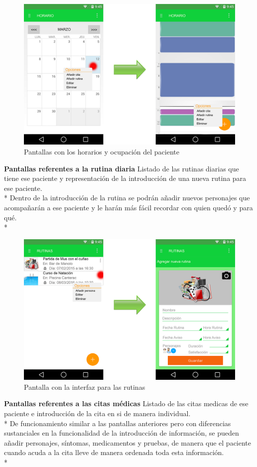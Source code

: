 \documentclass[../pfc.tex]{subfiles}
\begin{document}
			
			\begin{figure}[h]
				\centering
				\includegraphics[width=0.7\linewidth]{../images/horario_2}
				\caption{Pantallas con los horarios y ocupación del paciente}
				\label{fig:horario_2}
			\end{figure}
			
			
			\textbf{Pantallas referentes a la rutina diaria}
			Listado de las rutinas diarias que tiene ese paciente y representación de la introducción de una nueva rutina para ese paciente.\\*
			Dentro de la introducción de la rutina se podrán añadir nuevos personajes que acompañarán a ese paciente y le harán más fácil recordar con quien quedó y para qué.\\*

			
			\begin{figure}[h]
				\centering
				\includegraphics[width=0.7\linewidth]{../images/rutina}
				\caption{Pantalla con la interfaz para las rutinas}
				\label{fig:rutina}
			\end{figure}
						
			
			\textbf{Pantallas referentes a las citas médicas}
			Listado de las citas medicas de ese paciente e introducción de la cita en si de manera individual.\\*
			De funcionamiento similar a las pantallas anteriores pero con diferencias sustanciales en la funcionalidad de la introducción de información, se pueden añadir personajes, síntomas, medicamentos y pruebas, de manera que el paciente cuando acuda a la cita lleve de manera ordenada toda esta información.\\*
			
\end{document}
